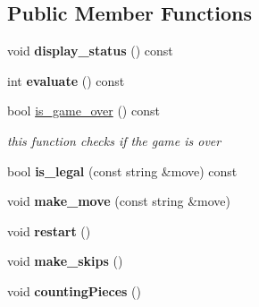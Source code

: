\subsection*{Public Member Functions}
\begin{DoxyCompactItemize}
\item 
void {\bfseries display\+\_\+status} () const \hypertarget{classmain__savitch__14_1_1Othello_a471f0e8f0e63ed32d764682f60110267}{}\label{classmain__savitch__14_1_1Othello_a471f0e8f0e63ed32d764682f60110267}

\item 
int {\bfseries evaluate} () const \hypertarget{classmain__savitch__14_1_1Othello_a1b3239a14882cbc7e7bd44c0b6828514}{}\label{classmain__savitch__14_1_1Othello_a1b3239a14882cbc7e7bd44c0b6828514}

\item 
bool \hyperlink{classmain__savitch__14_1_1Othello_a4387d20f953aab54025760ec3f72f7ca}{is\+\_\+game\+\_\+over} () const 
\begin{DoxyCompactList}\small\item\em this function checks if the game is over \end{DoxyCompactList}\item 
bool {\bfseries is\+\_\+legal} (const string \&move) const \hypertarget{classmain__savitch__14_1_1Othello_ab4fb0040d5e1dbe34c33fa11a82285cf}{}\label{classmain__savitch__14_1_1Othello_ab4fb0040d5e1dbe34c33fa11a82285cf}

\item 
void {\bfseries make\+\_\+move} (const string \&move)\hypertarget{classmain__savitch__14_1_1Othello_a1066b280efa5cb41039585669282fe06}{}\label{classmain__savitch__14_1_1Othello_a1066b280efa5cb41039585669282fe06}

\item 
void {\bfseries restart} ()\hypertarget{classmain__savitch__14_1_1Othello_abf872b8074bfa4c04119317dc3b39af2}{}\label{classmain__savitch__14_1_1Othello_abf872b8074bfa4c04119317dc3b39af2}

\item 
void {\bfseries make\+\_\+skips} ()\hypertarget{classmain__savitch__14_1_1Othello_a3177234195a490eef52343d957e64b5d}{}\label{classmain__savitch__14_1_1Othello_a3177234195a490eef52343d957e64b5d}

\item 
void {\bfseries counting\+Pieces} ()\hypertarget{classmain__savitch__14_1_1Othello_a19f49edfbe82b84922877e00bc854ed8}{}\label{classmain__savitch__14_1_1Othello_a19f49edfbe82b84922877e00bc854ed8}


\end{DoxyCompactItemize}
